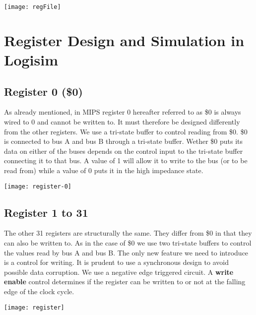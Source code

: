 \documentclass[12pt]{report}
\begin{document}
	\begin{center}
		\texttt{[image: regFile]}%
					\label{fig:fileImplementation}%
	\end{center}
    \section{Register Design and Simulation in Logisim}
    \subsection*{Register 0 (\$0)}
    As already mentioned, in MIPS register 0 hereafter referred to as \$0 is always wired to 0 and cannot be written to. It must therefore be designed differently from the other registers. We use a tri-state buffer to control reading from \$0. \$0 is connected to bus A and bus B through a tri-state buffer. Wether \$0 puts its data on either of the buses depends on the control input to the tri-state buffer connecting it to that bus. A value of 1 will allow it to write to the bus (or to be read from) while a value of 0 puts it in the high impedance state.
    
      \begin{center}
		\texttt{[image: register-0]}%
					\label{reg-0}%
	\end{center}
    \subsection*{Register 1 to 31} 
    The other 31 registers are structurally the same. They differ from \$0 in that they can also be written to.  As in the case of \$0 we use two tri-state buffers to control the values read by bus A and bus B. The only new feature we need to introduce is a control for writing. It is prudent to use a synchronous design to avoid possible data corruption. We use a negative edge triggered circuit. A \textbf{write enable} control determines if the register can be written to or not at the falling edge of the  clock cycle.
      \begin{center}
		\texttt{[image: register]}%
					\label{fig:reg-1-31}%
	\end{center}
	
\end{document}
